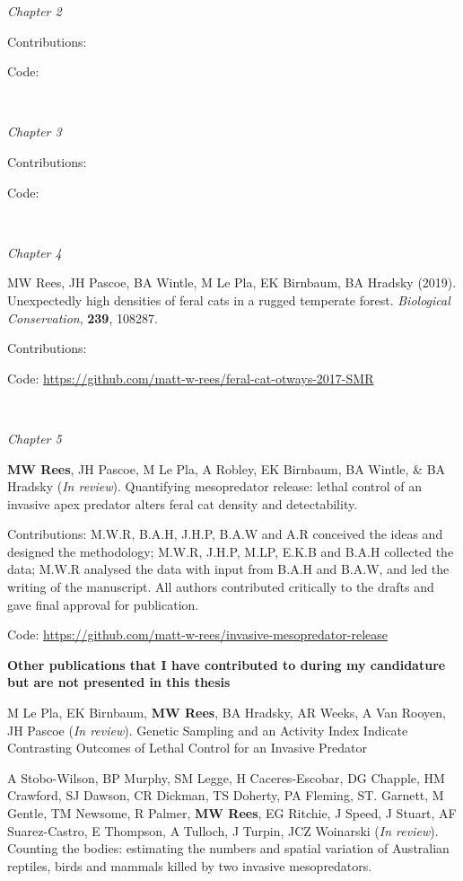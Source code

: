 \documentclass[11pt,a4paper,titlepage,twoside,openright]{style/unimelbthesis}
\begin{document}
\begin{frontmatter}
\begin{preface}
    \emph{Chapter 2}
    
    Contributions:
    
    Code:
    
    \(~\)
    
    \emph{Chapter 3}
    
    Contributions:
    
    Code:
    
    \(~\)
    
    \emph{Chapter 4}
    
    MW Rees, JH Pascoe, BA Wintle, M Le Pla, EK Birnbaum, BA Hradsky (2019). Unexpectedly high densities of feral cats in a rugged temperate forest. \emph{Biological Conservation}, \textbf{239}, 108287.
    
    Contributions:
    
    Code: \url{https://github.com/matt-w-rees/feral-cat-otways-2017-SMR}
    
    \(~\)
    
    \emph{Chapter 5}
    
    \textbf{MW Rees}, JH Pascoe, M Le Pla, A Robley, EK Birnbaum, BA Wintle, \& BA Hradsky (\emph{In review}). Quantifying mesopredator release: lethal control of an invasive apex predator alters feral cat density and detectability.
    
    Contributions: M.W.R, B.A.H, J.H.P, B.A.W and A.R conceived the ideas and designed the methodology; M.W.R, J.H.P, M.LP, E.K.B and B.A.H collected the data; M.W.R analysed the data with input from B.A.H and B.A.W, and led the writing of the manuscript. All authors contributed critically to the drafts and gave final approval for publication.
    
    Code: \url{https://github.com/matt-w-rees/invasive-mesopredator-release}
    
    \newpage
    
    \textbf{Other publications that I have contributed to during my candidature but are not presented in this thesis}
    
    M Le Pla, EK Birnbaum, \textbf{MW Rees}, BA Hradsky, AR Weeks, A Van Rooyen, JH Pascoe (\emph{In review}).
    Genetic Sampling and an Activity Index Indicate Contrasting Outcomes of Lethal Control for an Invasive Predator
    
    A Stobo-Wilson, BP Murphy, SM Legge, H Caceres-Escobar, DG Chapple, HM Crawford, SJ Dawson, CR Dickman, TS Doherty, PA Fleming, ST. Garnett, M Gentle, TM Newsome, R Palmer, \textbf{MW Rees}, EG Ritchie, J Speed, J Stuart, AF Suarez-Castro, E Thompson, A Tulloch, J Turpin, JCZ Woinarski (\emph{In review}). Counting the bodies: estimating the numbers and spatial variation of Australian reptiles, birds and mammals killed by two invasive mesopredators.
    

\end{preface}
\end{frontmatter}
\end{document}
